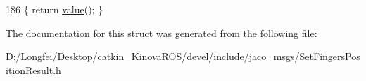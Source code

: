 \begin{DoxyCode}
186 \{ \textcolor{keywordflow}{return} \hyperlink{structros_1_1message__traits_1_1Definition_3_01_1_1jaco__msgs_1_1SetFingersPositionResult___3_01ContainerAllocator_01_4_01_4_a08a432f8a863ae1708f3ca2c12b96e9e}{value}(); \}
\end{DoxyCode}


The documentation for this struct was generated from the following file\+:\begin{DoxyCompactItemize}
\item 
D\+:/\+Longfei/\+Desktop/catkin\+\_\+\+Kinova\+R\+O\+S/devel/include/jaco\+\_\+msgs/\hyperlink{SetFingersPositionResult_8h}{Set\+Fingers\+Position\+Result.\+h}\end{DoxyCompactItemize}
